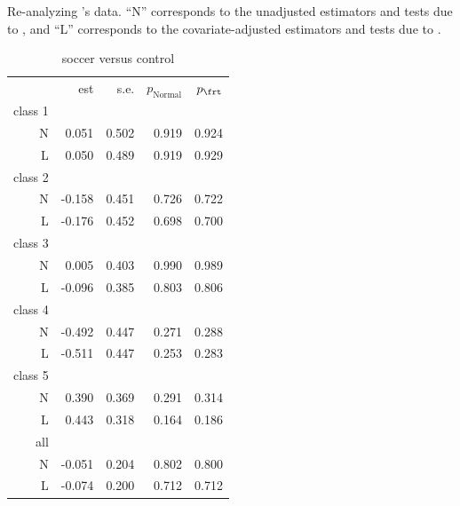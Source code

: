\begin{table}
\centering
\caption{Re-analyzing \citet{chong2016iron}'s data. ``\textsc{N}'' corresponds to the unadjusted estimators and tests due to \citet{Neyman:1923}, and ``\textsc{L}'' corresponds to the covariate-adjusted estimators and tests due to \citet{lin2013}.}\label{tb::pv-values-chong}
\begin{subtable}[h]{0.45\textwidth}
\caption{soccer versus control}
    \begin{tabular}{rrrrr}
    \hline 
   &    est & s.e. &$p_\text{Normal}$ & $p_\frt$ \\
       class 1& &&&\\
\textsc{N}  &  0.051 &0.502 &     0.919  & 0.924 \\
\textsc{L}   &    0.050 & 0.489 &     0.919 &  0.929 \\
       class 2& &&&\\
\textsc{N}  &  -0.158 &0.451  &    0.726  & 0.722\\
\textsc{L}   &  -0.176 & 0.452   &   0.698  & 0.700 \\
       class 3& &&&\\
\textsc{N}  &  0.005 &0.403  &    0.990 &  0.989 \\
\textsc{L}   &   -0.096& 0.385 &     0.803&   0.806 \\
       class 4& &&&\\
\textsc{N}  &  -0.492& 0.447  &    0.271 &  0.288 \\
\textsc{L}   &    -0.511& 0.447  &    0.253 &  0.283 \\
       class 5& &&&\\
\textsc{N}  &  0.390& 0.369 &     0.291 &  0.314 \\
\textsc{L}   &   0.443 &0.318  &    0.164  & 0.186 \\
       all& &&&\\
\textsc{N}  &  -0.051 & 0.204  &    0.802 &  0.800 \\
\textsc{L}   &    -0.074& 0.200   &   0.712  & 0.712\\
\hline 
    \end{tabular}
\end{subtable}


\end{table}
